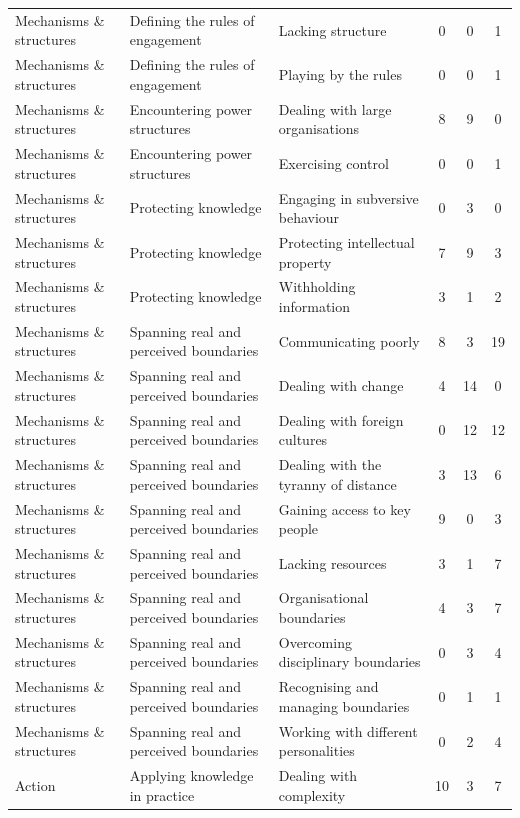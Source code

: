 \begin{landscape}
\begin{longtable}[c]{lllccc}
Mechanisms \& structures & Defining the rules of engagement & Lacking structure &   0 &   0 &   1 \\ 
Mechanisms \& structures & Defining the rules of engagement & Playing by the rules &   0 &   0 &   1 \\ 
Mechanisms \& structures & Encountering power structures & Dealing with large organisations &   8 &   9 &   0 \\ 
Mechanisms \& structures & Encountering power structures & Exercising control &   0 &   0 &   1 \\ 
Mechanisms \& structures & Protecting knowledge & Engaging in subversive behaviour &   0 &   3 &   0 \\ 
Mechanisms \& structures & Protecting knowledge & Protecting intellectual property &   7 &   9 &   3 \\ 
Mechanisms \& structures & Protecting knowledge & Withholding information &   3 &   1 &   2 \\ 
Mechanisms \& structures & Spanning real and perceived boundaries & Communicating poorly &   8 &   3 &  19 \\ 
Mechanisms \& structures & Spanning real and perceived boundaries & Dealing with change &   4 &  14 &   0 \\ 
Mechanisms \& structures & Spanning real and perceived boundaries & Dealing with foreign cultures &   0 &  12 &  12 \\ 
Mechanisms \& structures & Spanning real and perceived boundaries & Dealing with the tyranny of distance &   3 &  13 &   6 \\ 
Mechanisms \& structures & Spanning real and perceived boundaries & Gaining access to key people &   9 &   0 &   3 \\ 
Mechanisms \& structures & Spanning real and perceived boundaries & Lacking resources &   3 &   1 &   7 \\ 
Mechanisms \& structures & Spanning real and perceived boundaries & Organisational boundaries &   4 &   3 &   7 \\ 
Mechanisms \& structures & Spanning real and perceived boundaries & Overcoming disciplinary boundaries &   0 &   3 &   4 \\ 
Mechanisms \& structures & Spanning real and perceived boundaries & Recognising and managing boundaries &   0 &   1 &   1 \\ 
Mechanisms \& structures & Spanning real and perceived boundaries & Working with different personalities &   0 &   2 &   4 \\ 
Action & Applying knowledge in practice & Dealing with complexity &  10 &   3 &   7 \\ 

\end{longtable}
\end{landscape}
